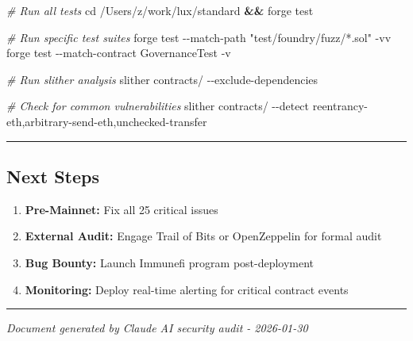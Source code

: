 \documentclass[
]{article}
\newenvironment{Shaded}{}{}
\newcommand{\AttributeTok}[1]{\textcolor[rgb]{0.49,0.56,0.16}{#1}}
\newcommand{\BuiltInTok}[1]{\textcolor[rgb]{0.00,0.50,0.00}{#1}}
\newcommand{\CommentTok}[1]{\textcolor[rgb]{0.38,0.63,0.69}{\textit{#1}}}
\newcommand{\ExtensionTok}[1]{#1}
\newcommand{\KeywordTok}[1]{\textcolor[rgb]{0.00,0.44,0.13}{\textbf{#1}}}
\newcommand{\NormalTok}[1]{#1}
\newcommand{\StringTok}[1]{\textcolor[rgb]{0.25,0.44,0.63}{#1}}
\providecommand{\tightlist}{%
  \setlength{\itemsep}{0pt}\setlength{\parskip}{0pt}}
\begin{document}
\begin{Shaded}
\begin{Highlighting}[]
\CommentTok{\# Run all tests}
\BuiltInTok{cd}\NormalTok{ /Users/z/work/lux/standard }\KeywordTok{\&\&} \ExtensionTok{forge}\NormalTok{ test}

\CommentTok{\# Run specific test suites}
\ExtensionTok{forge}\NormalTok{ test }\AttributeTok{{-}{-}match{-}path} \StringTok{"test/foundry/fuzz/*.sol"} \AttributeTok{{-}vv}
\ExtensionTok{forge}\NormalTok{ test }\AttributeTok{{-}{-}match{-}contract}\NormalTok{ GovernanceTest }\AttributeTok{{-}v}

\CommentTok{\# Run slither analysis}
\ExtensionTok{slither}\NormalTok{ contracts/ }\AttributeTok{{-}{-}exclude{-}dependencies}

\CommentTok{\# Check for common vulnerabilities}
\ExtensionTok{slither}\NormalTok{ contracts/ }\AttributeTok{{-}{-}detect}\NormalTok{ reentrancy{-}eth,arbitrary{-}send{-}eth,unchecked{-}transfer}
\end{Highlighting}
\end{Shaded}

\begin{center}\rule{0.5\linewidth}{0.5pt}\end{center}

\subsection{Next Steps}\label{next-steps}

\begin{enumerate}
\def\labelenumi{\arabic{enumi}.}
\tightlist
\item
  \textbf{Pre-Mainnet:} Fix all 25 critical issues
\item
  \textbf{External Audit:} Engage Trail of Bits or OpenZeppelin for
  formal audit
\item
  \textbf{Bug Bounty:} Launch Immunefi program post-deployment
\item
  \textbf{Monitoring:} Deploy real-time alerting for critical contract
  events
\end{enumerate}

\begin{center}\rule{0.5\linewidth}{0.5pt}\end{center}

\emph{Document generated by Claude AI security audit - 2026-01-30}
\end{document}
